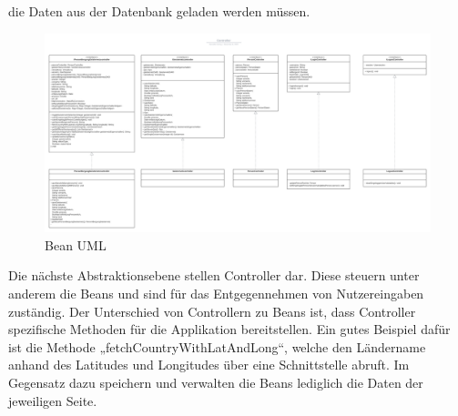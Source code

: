 \documentclass[11pt]{article}
\begin{document}
    die Daten aus der Datenbank geladen werden müssen.
    \begin{figure}[H]
        \centering
        \includegraphics[width=\textwidth]{abbildungen/UML-Controller.png}
        \caption{Bean UML}
        \label{uml-controller}
    \end{figure} 
    Die nächste Abstraktionsebene stellen Controller dar. Diese steuern unter anderem die Beans und sind für das Entgegennehmen von Nutzereingaben zuständig.
    Der Unterschied von Controllern zu Beans ist, dass Controller spezifische Methoden für die Applikation bereitstellen. Ein gutes Beispiel dafür ist die Methode „fetchCountryWithLatAndLong“, welche den Ländername anhand des Latitudes und Longitudes über eine Schnittstelle abruft. 
    Im Gegensatz dazu speichern und verwalten die Beans lediglich die Daten der jeweiligen Seite.

    \newpage
\end{document}
